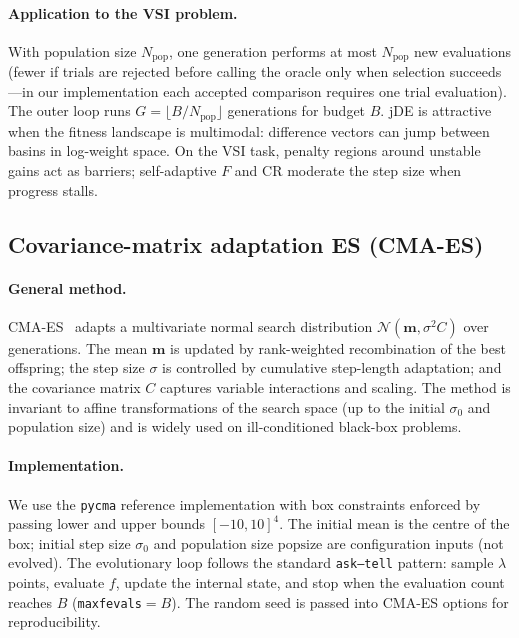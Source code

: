 \documentclass[pdflatex,sn-mathphys-num]{sn-jnl}
\begin{document}
\paragraph{Application to the VSI problem.}
With population size $N_{\mathrm{pop}}$, one generation performs at most $N_{\mathrm{pop}}$ new evaluations (fewer if trials are rejected before calling the oracle only when selection succeeds---in our implementation each accepted comparison requires one trial evaluation).
The outer loop runs $G=\lfloor B/N_{\mathrm{pop}}\rfloor$ generations for budget $B$.
jDE is attractive when the fitness landscape is multimodal: difference vectors can jump between basins in log-weight space.
On the VSI task, penalty regions around unstable gains act as barriers; self-adaptive $F$ and $\mathrm{CR}$ moderate the step size when progress stalls.

\subsection{Covariance-matrix adaptation ES (CMA-ES)}\label{subsec:cma}

\paragraph{General method.}
CMA-ES~\cite{hansen2001completely} adapts a multivariate normal search distribution $\mathcal{N}(\mathbf{m},\sigma^2 C)$ over generations.
The mean $\mathbf{m}$ is updated by rank-weighted recombination of the best offspring; the step size $\sigma$ is controlled by cumulative step-length adaptation; and the covariance matrix $C$ captures variable interactions and scaling.
The method is invariant to affine transformations of the search space (up to the initial $\sigma_0$ and population size) and is widely used on ill-conditioned black-box problems.

\paragraph{Implementation.}
We use the \texttt{pycma} reference implementation with box constraints enforced by passing lower and upper bounds $[-10,10]^4$.
The initial mean is the centre of the box; initial step size $\sigma_0$ and population size $\mathrm{popsize}$ are configuration inputs (not evolved).
The evolutionary loop follows the standard \texttt{ask--tell} pattern: sample $\lambda$ points, evaluate $f$, update the internal state, and stop when the evaluation count reaches $B$ (\texttt{maxfevals}$=B$).
The random seed is passed into CMA-ES options for reproducibility.
\end{document}
